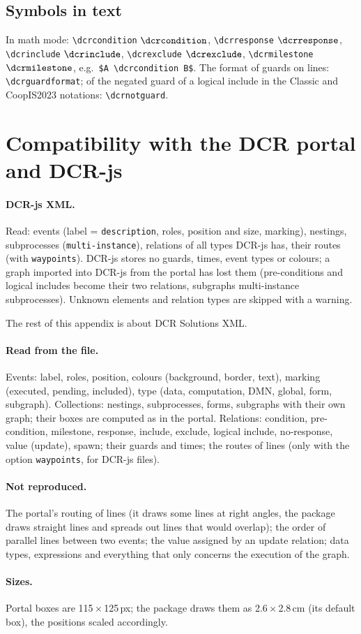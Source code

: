 \documentclass[a4paper,11pt]{article}
\newcommand\cs[1]{\texttt{\textbackslash#1}}
\newcommand\key[1]{\texttt{#1}}
\begin{document}
\subsection{Symbols in text}\label{sec:symbols}
In math mode: \cs{dcrcondition} $\dcrcondition$, \cs{dcrresponse} $\dcrresponse$,
\cs{dcrinclude} $\dcrinclude$, \cs{dcrexclude} $\dcrexclude$,
\cs{dcrmilestone} $\dcrmilestone$, e.g.\ \verb|$A \dcrcondition B$|.
The format of guards on lines: \cs{dcrguardformat}; of the negated guard of a
logical include in the Classic and CoopIS2023 notations: \cs{dcrnotguard}.

\appendix
\section{Compatibility with the DCR portal and DCR-js}\label{sec:compat}
\paragraph{DCR-js XML.} Read: events (label = \texttt{description}, roles,
position and size, marking), nestings, subprocesses (\texttt{multi-instance}),
relations of all types DCR-js has, their routes (with \key{waypoints}).
DCR-js stores no guards, times, event types or colours; a graph imported into
DCR-js from the portal has lost them (pre-conditions and logical includes
become their two relations, subgraphs multi-instance subprocesses). Unknown
elements and relation types are skipped with a warning.

The rest of this appendix is about DCR Solutions XML.

\paragraph{Read from the file.} Events: label, roles, position, colours
(background, border, text), marking (executed, pending, included), type
(data, computation, DMN, global, form, subgraph). Collections: nestings,
subprocesses, forms, subgraphs with their own graph; their boxes are
computed as in the portal. Relations: condition, pre-condition, milestone,
response, include, exclude, logical include, no-response, value (update),
spawn; their guards and times; the routes of lines (only with the option
\key{waypoints}, for DCR-js files).

\paragraph{Not reproduced.} The portal's routing of lines (it draws some
lines at right angles, the package draws straight lines and spreads out
lines that would overlap); the order of parallel lines between two events;
the value assigned by an update relation; data types, expressions and
everything that only concerns the execution of the graph.

\paragraph{Sizes.} Portal boxes are 115\,$\times$\,125\,px; the package draws
them as 2.6\,$\times$\,2.8\,cm (its default box), the positions scaled
accordingly.
\end{document}
